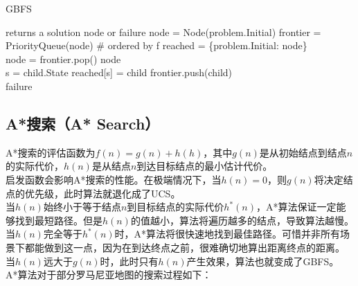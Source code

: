 \begin{algorithm}[H]
    \caption{GBFS}
    \begin{algorithmic}[1]
         returns a solution node or failure
        \State node = Node(problem.Initial)
        \State frontier = PriorityQueue(node)   \# ordered by f
        \State reached = \{problem.Initial: node\}
        \\
        \State node = frontier.pop()
        \State \Return node
        \EndIf
        \\
        \State s = child.State
        \State reached[s] = child
        \State frontier.push(child)
        \EndIf
        \EndFor
        \EndWhile
        \\
        \State \Return failure
        \EndProcedure
    \end{algorithmic}
\end{algorithm}

\vspace{0.5cm}

\subsection{A*搜索（A* Search）}

A*搜索的评估函数为$ f(n) = g(n) + h(h) $，其中$ g(n) $是从初始结点到结点$ n $的实际代价，$ h(n) $是从结点$ n $到达目标结点的最小估计代价。\\

启发函数会影响A*搜索的性能。在极端情况下，当$ h(n) = 0 $，则$ g(n) $将决定结点的优先级，此时算法就退化成了UCS。\\

当$ h(n) $始终小于等于结点$ n $到目标结点的实际代价$ h^*(n) $，A*算法保证一定能够找到最短路径。但是$ h(n) $的值越小，算法将遍历越多的结点，导致算法越慢。\\

当$ h(n) $完全等于$ h^*(n) $时，A*算法将很快速地找到最佳路径。可惜并非所有场景下都能做到这一点，因为在到达终点之前，很难确切地算出距离终点的距离。\\

当$ h(n) $远大于$ g(n) $时，此时只有$ h(n) $产生效果，算法也就变成了GBFS。\\

A*算法对于部分罗马尼亚地图的搜索过程如下：

